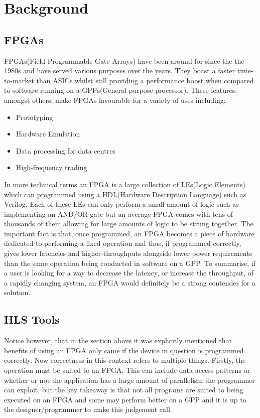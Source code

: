 \chapter{Background}

\section{FPGAs}
FPGAs(Field-Programmable Gate Arrays) have been around for since the the 1980s and have served various purposes over the years\cite{fpga-history}. They boast a faster time-to-market than ASICs whilst still providing a performance boost when compared to software running on a GPPs(General purpose processor). These features, amongst others, make FPGAs favourable for a variety of uses including:
\begin{itemize}
    \item Prototyping
    \item Hardware Emulation
    \item Data processing for data centres
    \item High-frequency trading
 \end{itemize}

In more technical terms an FPGA is a large collection of LEs(Logic Elements) which can programmed using a HDL(Hardware Description Language) such as Verilog. Each of these LEs can only perform a small amount of logic such as implementing an AND/OR gate but an average FPGA comes with tens of thousands of them allowing for large amounts of logic to be strung together. The important fact is that, once programmed, an FPGA becomes a piece of hardware dedicated to performing a fixed operation and thus, if programmed correctly, gives lower latencies and higher-throughputs alongside lower power requirements than the same operation being conducted in software on a GPP. To summarise, if a user is looking for a way to decrease the latency, or increase the throughput, of a rapidly changing system, an FPGA would definitely be a strong contender for a solution. 

\section{HLS Tools}
Notice however, that in the section above it was explicitly mentioned that benefits of using an FPGA only came if the device in question is programmed correctly. Now correctness in this context refers to multiple things. Firstly, the operation must be suited to an FPGA. This can include data access patterns or whether or not the application has a large amount of parallelism the programmer can exploit, but the key takeaway is that not all programs are suited to being executed on an FPGA and some may perform better on a GPP and it is up to the designer/programmer to make this judgement call.

